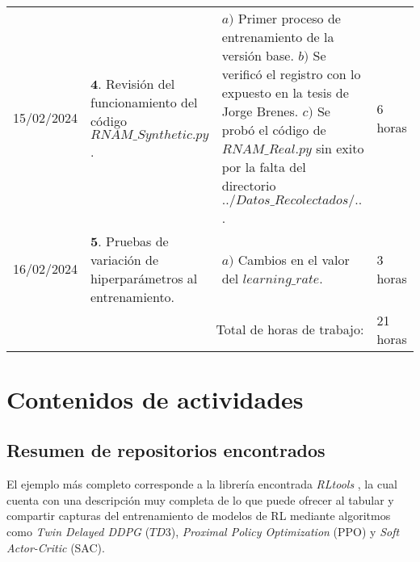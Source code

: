 \documentclass[12pt]{article}
\begin{document}
\hfill\\
\begin{minipage}[h]{\textwidth}
	\centering
	\begin{tabularx}{\textwidth}{|p{2cm}|X|X|p{2cm}|} 
		\hline		
		
	 	15/02/2024 & 
	 	$\mathbf{4}.$ Revisión del funcionamiento del código $RNAM\_ Synthetic.py$. & 
	 	$a)$ Primer proceso de entrenamiento de la versión base. \newline 
	 	$b)$ Se verificó el registro con lo expuesto en la tesis de Jorge Brenes. \newline 
	 	$c)$ Se probó el código de $RNAM\_ Real.py$ sin exito por la falta del directorio $../Datos\_ Recolectados/..$. \newline & 
	 	6 horas \\
	 	16/02/2024 & 
	 	$\mathbf{5}.$ Pruebas de variación de hiperparámetros al entrenamiento. & 
	 	$a)$ Cambios en el valor del $learning\_ rate$.\newline & 
	 	3 horas \\
	 	\hline
		\multicolumn{3}{|r|}{Total de horas de trabajo:} & 21 horas \\ 
	 	\hline                 
	\end{tabularx}
\end{minipage}

\newpage

\section*{Contenidos de actividades}

\subsection*{Resumen de repositorios encontrados}

El ejemplo más completo corresponde a la librería encontrada \textit{RLtools} \cite{rltools}, la cual cuenta con una descripción muy completa de lo que puede ofrecer al tabular y compartir capturas del entrenamiento de modelos de RL mediante algoritmos como \textit{Twin Delayed DDPG} ($TD3$), \textit{Proximal Policy Optimization} (PPO) y \textit{Soft Actor-Critic} (SAC).
\end{document}
